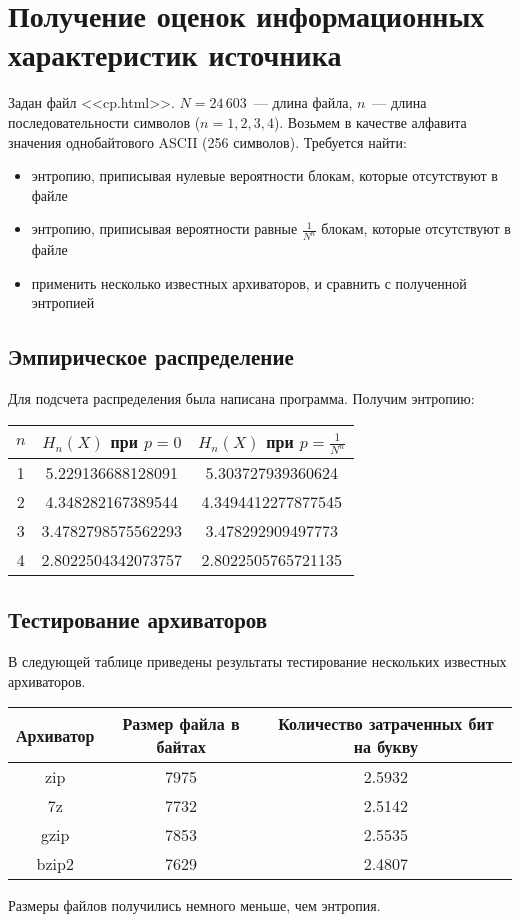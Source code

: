 \section{Получение оценок информационных характеристик источника}
Задан файл <<cp.html>>. $N = 24{\,}603$~--- длина файла, $n$~--- длина последовательности символов ($n = 1, 2, 3, 4$).
Возьмем в качестве алфавита значения однобайтового ASCII (256 символов).
Требуется найти:
\begin{itemize}
    \item{энтропию, приписывая нулевые вероятности блокам, которые отсутствуют в файле}
    \item{энтропию, приписывая вероятности равные $\frac1{N^n}$ блокам, которые отсутствуют в файле}
    \item{применить несколько известных архиваторов, и сравнить с полученной энтропией}
\end{itemize}

\subsection{Эмпирическое распределение}

Для подсчета распределения была написана программа. Получим энтропию:
\begin{center}
    \begin{tabular}{|c|c|c|}
        \hline
        $n$&$H_n(X)$ при $p = 0$&$H_n(X)$ при $p=\frac1{N^n}$ \\
        \hline
        1&5.229136688128091 &5.303727939360624 \\
        \hline
        2&4.348282167389544 &4.3494412277877545 \\
        \hline
        3&3.4782798575562293 &3.478292909497773\\
        \hline
        4&2.8022504342073757 &2.8022505765721135\\
        \hline
    \end{tabular}
\end{center}

\subsection{Тестирование архиваторов}
В следующей таблице приведены результаты тестирование нескольких известных архиваторов.
\begin{center}
    \begin{tabular}{|c|c|c|}
        \hline
        Архиватор&Размер файла в байтах&Количество затраченных бит на букву\\
        \hline
        zip&7975&2.5932\\
        \hline
        7z&7732&2.5142\\
        \hline
        gzip&7853&2.5535\\
        \hline
        bzip2&7629&2.4807\\
        \hline
    \end{tabular}
\end{center}

Размеры файлов получились немного меньше, чем энтропия.